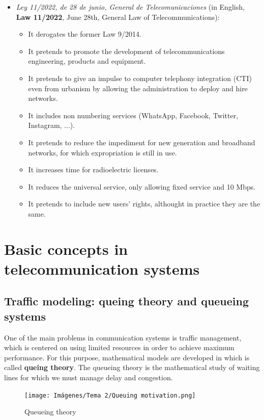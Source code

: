 \documentclass[
	12pt,
	twoside
]{book}
\begin{document}
\begin{itemize}
	\item {
		\textit{Ley 11/2022, de 28 de junio, General de Telecomunicaciones} (in English, \textbf{Law 11/2022}, June 28th, General Law of Telecommunications):
		\begin{itemize}
			\item It derogates the former Law 9/2014.
			\item It pretends to promote the development of telecommunications engineering, products and equipment.
			\item It pretends to give an impulse to computer telephony integration (CTI) even from urbanism by allowing the administration to deploy and hire networks.
			\item It includes non numbering services (WhatsApp, Facebook, Twitter, Instagram, ...).
			\item It pretends to reduce the impediment for new generation and broadband networks, for which expropriation is still in use.
			\item It increases time for radioelectric licenses.
			\item It reduces the universal service, only allowing fixed service and 10 Mbps.
			\item It pretends to include new users' rights, althought in practice they are the same.
		\end{itemize}
	}
\end{itemize}

\chapter{Basic concepts in telecommunication systems}

\section{Traffic modeling: queing theory and queueing systems}

One of the main problems in communication systems is traffic management, which is centered on using limited resources in order to achieve maximum performance. For this purpose, mathematical models are developed in which is called \textbf{queing theory}. The queueing theory is the mathematical study of waiting lines for which we must manage delay and congestion.

\begin{figure}[H]
	\centering
	\texttt{[image: Imágenes/Tema 2/Queuing motivation.png]}
	\caption{
		\label{fig:unit2_qtheory}
		Queueing theory
	}
\end{figure}
\end{document}
